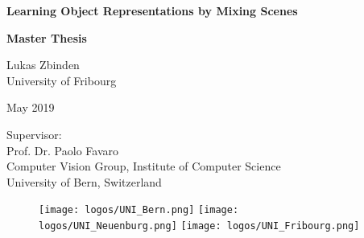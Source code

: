 \documentclass[a4paper,12pt]{report}
\begin{document}
\begin{titlepage}  
  \begin{center}  
  
  \begin{figure}[t]  
  \vspace*{-2cm}        %
  \vspace{0.4in}     
  \end{figure}

    \thispagestyle{empty}
    
    {\bfseries\Huge Learning Object Representations by Mixing Scenes}

    \vspace{0.3in} 
    \LARGE{\textbf{Master Thesis} \\}
    \vspace{0.4in}

    {\Large Lukas Zbinden \\
    University of Fribourg}
    
    \vspace{0.3in}
    \vfill
    {\Large May 2019 \par}
    
	\vfill
	{\Large
	Supervisor: \\
	Prof. Dr. Paolo Favaro\\
	Computer Vision Group, Institute of Computer Science\\
	University of Bern, Switzerland}
  

  \vspace{0.9in}
 
  \begin{figure}[htp]
    \centering
    \texttt{[image: logos/UNI\_Bern.png]}\hfill
    \texttt{[image: logos/UNI\_Neuenburg.png]}\hfill
    \texttt{[image: logos/UNI\_Fribourg.png]}
  \end{figure}


  \end{center}

\end{titlepage}
\end{document}
